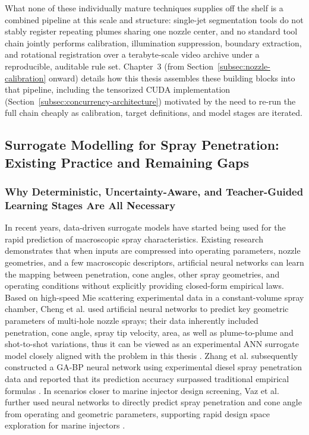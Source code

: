 What none of these individually mature techniques supplies off the shelf is a combined pipeline at this scale and structure: single-jet segmentation tools do not stably register repeating plumes sharing one nozzle center, and no standard tool chain jointly performs calibration, illumination suppression, boundary extraction, and rotational registration over a terabyte-scale video archive under a reproducible, auditable rule set. Chapter~3 (from Section~\ref{subsec:nozzle-calibration} onward) details how this thesis assembles these building blocks into that pipeline, including the tensorized CUDA implementation (Section~\ref{subsec:concurrency-architecture}) motivated by the need to re-run the full chain cheaply as calibration, target definitions, and model stages are iterated.

\subsection{Surrogate Modelling for Spray Penetration: Existing Practice and Remaining Gaps}

\subsubsection{Why Deterministic, Uncertainty-Aware, and Teacher-Guided Learning Stages Are All Necessary}

In recent years, data-driven surrogate models have started being used for the rapid prediction of macroscopic spray characteristics.
Existing research demonstrates that when inputs are compressed into operating parameters, nozzle geometries, and a few macroscopic descriptors, artificial neural networks can learn the mapping between penetration, cone angles, other spray geometries, and operating conditions without explicitly providing closed-form empirical laws.
Based on high-speed Mie scattering experimental data in a constant-volume spray chamber, Cheng et al. used artificial neural networks to predict key geometric parameters of multi-hole nozzle sprays;
their data inherently included penetration, cone angle, spray tip velocity, area, as well as plume-to-plume and shot-to-shot variations, thus it can be viewed as an experimental ANN surrogate model closely aligned with the problem in this thesis \cite{ChengAhmadGrahn2023}.
Zhang et al. subsequently constructed a GA-BP neural network using experimental diesel spray penetration data and reported that its prediction accuracy surpassed traditional empirical formulas \cite{ZhangWuXu2024}.
In scenarios closer to marine injector design screening, Vaz et al. further used neural networks to directly predict spray penetration and cone angle from operating and geometric parameters, supporting rapid design space exploration for marine injectors \cite{VazKarathanasis2026}.


